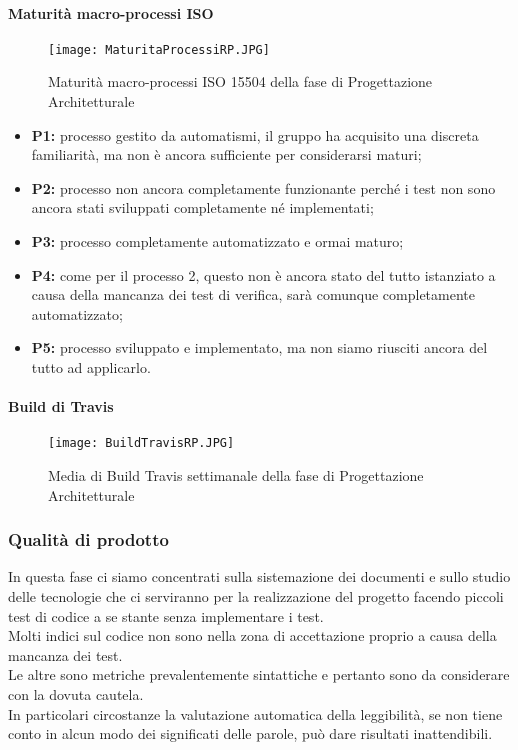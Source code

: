 \paragraph{Maturità macro-processi ISO }
\hspace{15cm}
\begin{figure}[!htbp]
	\centering
	\texttt{[image: MaturitaProcessiRP.JPG]}
	\caption{Maturità macro-processi ISO 15504 della fase di Progettazione Architetturale }
\end{figure}
\begin{itemize}
	\item \textbf{P1:} processo gestito da automatismi, il gruppo ha acquisito una discreta familiarità, ma non è ancora sufficiente per considerarsi maturi;   
	\item \textbf{P2:} processo non ancora completamente funzionante perché i test non sono ancora stati sviluppati completamente né implementati;
	\item \textbf{P3:} processo completamente automatizzato e ormai maturo;
	\item \textbf{P4:} come per il processo 2, questo non è ancora stato del tutto istanziato a causa della mancanza dei test di verifica, sarà comunque completamente automatizzato;
	\item \textbf{P5:} processo sviluppato e implementato, ma non siamo riusciti ancora del tutto ad applicarlo.
\end{itemize}
\newpage
\paragraph{Build di Travis}
\hspace{15cm}
\begin{figure}[!htbp]
	\centering
	\texttt{[image: BuildTravisRP.JPG]}
	\caption{Media di Build Travis settimanale della fase di Progettazione Architetturale}
\end{figure}
    
\subsubsection{Qualità di prodotto}
In questa fase ci siamo concentrati sulla sistemazione dei documenti e sullo studio delle tecnologie che ci serviranno per la realizzazione del progetto facendo piccoli test di codice a se stante senza implementare i test.\\
Molti indici sul codice non sono nella zona di accettazione proprio a causa della mancanza dei test.\\
Le altre sono metriche prevalentemente sintattiche e pertanto sono da considerare con la dovuta cautela. \\
In particolari circostanze la valutazione automatica della leggibilità, se non tiene conto in alcun modo dei significati delle parole, può dare risultati inattendibili. \newpage
